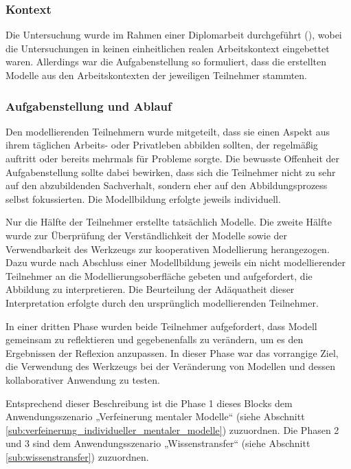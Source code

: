 \subsubsection{Kontext} %
\label{ssub:1_kontext}

Die Untersuchung wurde im Rahmen einer Diplomarbeit durchgeführt (\cite{Bohninger10}), wobei die Untersuchungen in keinen einheitlichen realen Arbeitskontext eingebettet waren. Allerdings war die Aufgabenstellung so formuliert, dass die erstellten Modelle aus den Arbeitskontexten der jeweiligen Teilnehmer stammten.


\subsubsection{Aufgabenstellung und Ablauf} %
\label{ssub:1_aufgabenstellung}

Den modellierenden Teilnehmern wurde mitgeteilt, dass sie einen Aspekt aus ihrem täglichen Arbeits- oder Privatleben abbilden sollten, der regelmäßig auftritt oder bereits mehrmals für Probleme sorgte. Die bewusste Offenheit der Aufgabenstellung sollte dabei bewirken, dass sich die Teilnehmer nicht zu sehr auf den abzubildenden Sachverhalt, sondern eher auf den Abbildungsprozess selbst fokussierten. Die Modellbildung erfolgte jeweils individuell.

Nur die Hälfte der Teilnehmer erstellte tatsächlich Modelle. Die zweite Hälfte wurde zur Überprüfung der Verständlichkeit der Modelle sowie der Verwendbarkeit des Werkzeugs zur kooperativen Modellierung herangezogen. Dazu wurde nach Abschluss einer Modellbildung jeweils ein nicht modellierender Teilnehmer an die Modellierungsoberfläche gebeten und aufgefordert, die Abbildung zu interpretieren. Die Beurteilung der Adäquatheit dieser Interpretation erfolgte durch den ursprünglich modellierenden Teilnehmer.

In einer dritten Phase wurden beide Teilnehmer aufgefordert, dass Modell gemeinsam zu reflektieren und gegebenenfalls zu verändern, um es den Ergebnissen der Reflexion anzupassen. In dieser Phase war das vorrangige Ziel, die Verwendung des Werkzeugs bei der Veränderung von Modellen und dessen kollaborativer Anwendung zu testen. 

Entsprechend dieser Beschreibung ist die Phase 1 dieses Blocks dem Anwendungsszenario „Verfeinerung mentaler Modelle“ (siehe Abschnitt \ref{sub:verfeinerung_individueller_mentaler_modelle}) zuzuordnen. Die Phasen 2 und 3 sind dem Anwendungsszenario „Wissenstransfer“ (siehe Abschnitt \ref{sub:wissenstransfer}) zuzuordnen.


